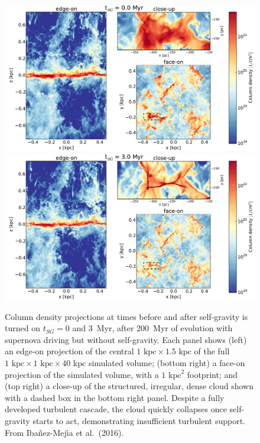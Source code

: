 \documentclass[11pt,preprint]{article}
\begin{document}
\begin{figure}
\centering 

\includegraphics[width=1\textwidth]{test_composite0.pdf} \\
\includegraphics[width=1\textwidth]{test_composite1.pdf} 
\caption{Column density projections at times before and after self-gravity is turned on $t_{SG}= 0$ and 3~Myr, after 200~Myr of evolution with supernova driving but without self-gravity.
Each panel shows (left) an edge-on projection of the central $1 \textrm{~kpc} \times 1.5 \textrm{~kpc}$ of the full $1 \textrm{~kpc} \times 1 \textrm{~kpc} \times 40 \textrm{~kpc}$ simulated volume; (bottom right) a face-on projection of the simulated volume, with a $1 \textrm{~kpc}^2$ footprint; and (top right) 
a close-up of the structured, irregular, dense cloud shown with a dashed box in the bottom right panel. Despite a fully developed turbulent cascade, the cloud quickly collapses once self-gravity starts to act, demonstrating insufficient turbulent support.   From Iba\~nez-Mej\'{\i}a et al.\ (2016).
\label{fig:StratBox_composite}
}
\end{figure}
\end{document}
